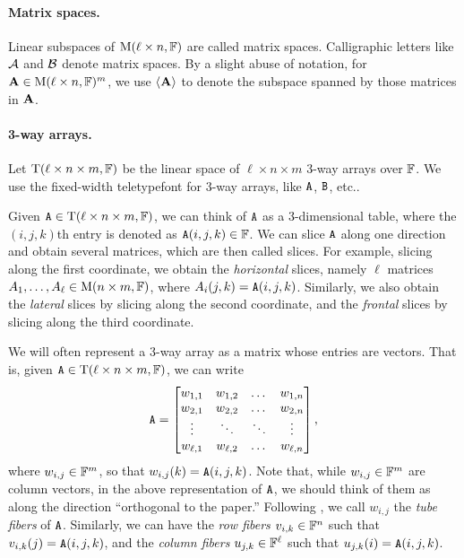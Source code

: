 \documentclass[11pt]{article}
\begin{document}
\paragraph{Matrix spaces.} Linear subspaces of $\mathrm{M}(\ell\times n, \mathbb{F})$ are called 
matrix 
spaces. Calligraphic letters like $\mathcal{A}$ and $\mathcal{B}$ denote 
matrix spaces. By a slight abuse of notation, 
for $\mathbf{A}\in 
\mathrm{M}(\ell\times n, \mathbb{F})^m$, we use $\langle \mathbf{A}\rangle$ to denote 
the subspace spanned by those matrices in $\mathbf{A}$.

\paragraph{3-way arrays.} Let $\mathrm{T}(\ell\times n\times m, \mathbb{F})$ be the linear space 
of $\ell\times n\times m$ 3-way arrays over $\mathbb{F}$. We use the fixed-width teletypefont for 3-way 
arrays, like $\mathtt{A}$, $\mathtt{B}$, etc.. 

Given $\mathtt{A}\in \mathrm{T}(\ell\times n\times m, \mathbb{F})$, we can 
think of $\mathtt{A}$ as a 3-dimensional table, where the $(i,j,k)$th entry is denoted as 
$\mathtt{A}(i,j,k)\in \mathbb{F}$. We can slice $\mathtt{A}$ along one direction and obtain several 
matrices, which are then called slices. For example, slicing along the first 
coordinate, we obtain the \emph{horizontal} slices, namely $\ell$ matrices $A_1, 
\dots, A_\ell\in \mathrm{M}(n\times m, \mathbb{F})$, where $A_i(j,k)=\mathtt{A}(i,j,k)$. Similarly, we 
also obtain the \emph{lateral} slices by slicing along the second coordinate, and 
the \emph{frontal} slices by slicing along the third coordinate. 

We will often represent a 3-way array as a matrix whose entries are vectors. That 
is, given $\mathtt{A}\in\mathrm{T}(\ell\times n\times m, \mathbb{F})$, we can write
$$
\mathtt{A}=\begin{bmatrix}
w_{1,1} & w_{1,2} & \dots & w_{1,n}\\
w_{2,1} & w_{2,2} & \dots & w_{2,n}\\
\vdots & \ddots & \ddots & \vdots \\
w_{\ell,1} & w_{\ell,2} & \dots & w_{\ell, n}
\end{bmatrix},
$$
where $w_{i,j}\in \mathbb{F}^m$, so that $w_{i,j}(k)=\mathtt{A}(i,j,k)$. Note that, while 
$w_{i,j}\in \mathbb{F}^m$ are column vectors, in the above representation of $\mathtt{A}$, we 
should think of them as along 
the direction ``orthogonal to the paper.'' Following \cite{KB09}, we call 
$w_{i,j}$ the 
\emph{tube fibers} of $\mathtt{A}$. Similarly, we can have the \emph{row fibers} 
$v_{i,k}\in\mathbb{F}^n$ such that $v_{i,k}(j)=\mathtt{A}(i,j,k)$, and the \emph{column fibers} 
$u_{j,k}\in\mathbb{F}^\ell$ such that $u_{j,k}(i)=\mathtt{A}(i,j,k)$.
\end{document}
